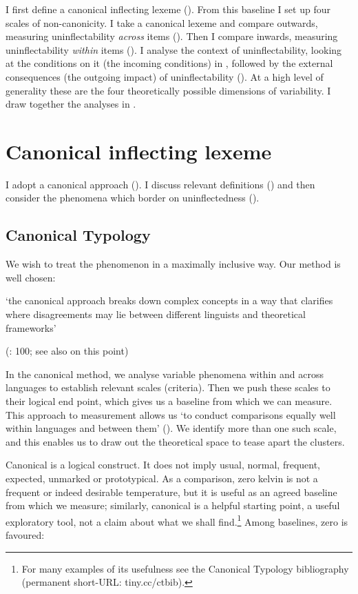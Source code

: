 \documentclass[output=paper]{langscibook}
\begin{document}
I first define a canonical inflecting lexeme (). From this baseline I set up four scales of non\nobreakdash-canonicity. I take a canonical lexeme and compare outwards, measuring uninflectability \textit{across} items (). Then I compare inwards, measuring uninflectability \textit{within} items (). I analyse the context of uninflectability, looking at the conditions on it (the incoming conditions) in , followed by the external consequences (the outgoing impact) of uninflectability (). At a high level of generality these are the four theoretically possible dimensions of variability. I draw together the analyses in .

\section{\textbf{Canonical} \textbf{inflecting} \textbf{lexeme}}

I adopt a canonical approach (). I discuss relevant definitions () and then consider the phenomena which border on uninflectedness ().

\subsection{\textbf{Canonical} \textbf{Typology}}

We wish to treat the phenomenon in a maximally inclusive way. Our method is well chosen:

‘the canonical approach breaks down complex concepts in a way that clarifies where disagreements may lie between different linguists and theoretical frameworks’ 

(\citealt{Nikolaeva2013}: 100; see also \citealt{Round2023} on this point)

In the canonical method, we analyse variable phenomena within and across languages to establish relevant scales (criteria). Then we push these scales to their logical end point, which gives us a baseline from which we can measure. This approach to measurement allows us ‘to conduct comparisons equally well within languages and between them’ (\citealt{RoundCorbett2020}). We identify more than one such scale, and this enables us to draw out the theoretical space to tease apart the clusters.

Canonical is a logical construct. It does not imply usual, normal, frequent, expected, unmarked or prototypical. As a comparison, zero kelvin is not a frequent or indeed desirable temperature, but it is useful as an agreed baseline from which we measure; similarly, canonical is a helpful starting point, a useful exploratory tool, not a claim about what we shall find.\footnote{For many examples of its usefulness see the Canonical Typology bibliography (permanent short-URL: tiny.cc/ctbib).} Among baselines, zero is favoured: 
\end{document}

